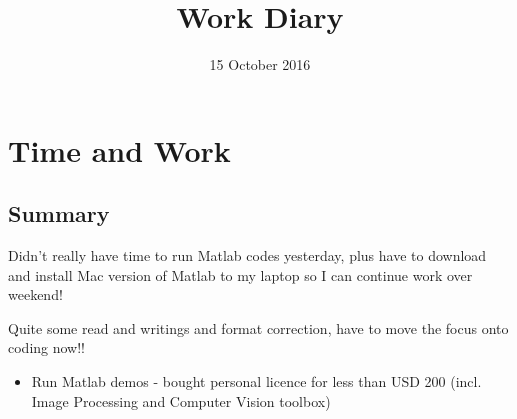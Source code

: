 \documentclass[a4paper]{article}
\title{Work Diary}
\author{}
\date{15 October 2016}
\begin{document}
\maketitle
	

\section{Time and Work}

\subsection{Summary}
Didn't really have time to run Matlab codes yesterday, plus have to download and install Mac version of Matlab to my laptop so I can continue work over weekend!

Quite some read and writings and format correction, have to move the focus onto coding now!!
\begin{itemize}

	\item Run Matlab demos - bought personal licence for less than USD 200 (incl. Image Processing and Computer Vision toolbox) 
\end{itemize}
\end{document}
